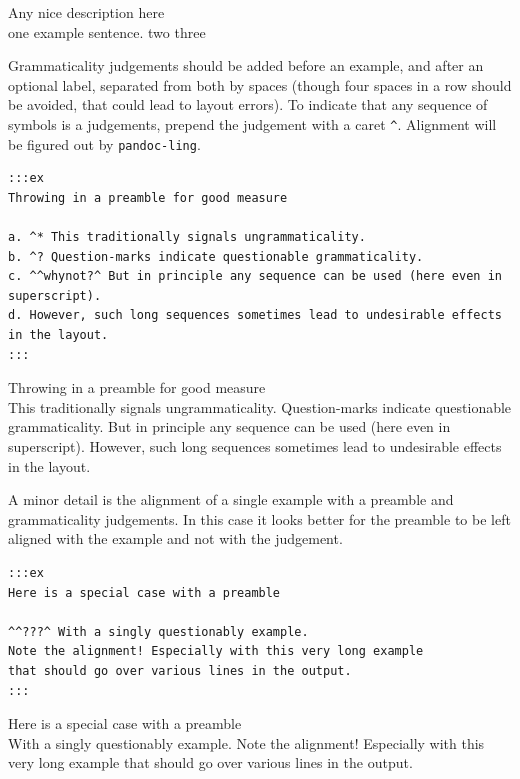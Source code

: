\documentclass[
]{article}
\begin{document}
\begin{samepage}
 Any nice description here\\
  \a one example sentence.
  \a two
  \a three
\xe
\end{samepage}

Grammaticality judgements should be added before an example, and after
an optional label, separated from both by spaces (though four spaces in
a row should be avoided, that could lead to layout errors). To indicate
that any sequence of symbols is a judgements, prepend the judgement with
a caret \texttt{\^{}}. Alignment will be figured out by
\texttt{pandoc-ling}.

\begin{verbatim}
:::ex
Throwing in a preamble for good measure

a. ^* This traditionally signals ungrammaticality.
b. ^? Question-marks indicate questionable grammaticality.
c. ^^whynot?^ But in principle any sequence can be used (here even in superscript).
d. However, such long sequences sometimes lead to undesirable effects in the layout.
:::
\end{verbatim}

\begin{samepage}
 Throwing in a preamble for good measure\\
  \a \ljudge{*}This traditionally signals ungrammaticality.
  \a {}Question-marks indicate questionable grammaticality.
  \a {}But in principle any sequence can
be used (here even in superscript).
  \a However, such long sequences sometimes lead to undesirable effects
in the layout.
\xe
\end{samepage}

A minor detail is the alignment of a single example with a preamble and
grammaticality judgements. In this case it looks better for the preamble
to be left aligned with the example and not with the judgement.

\begin{verbatim}
:::ex
Here is a special case with a preamble

^^???^ With a singly questionably example.
Note the alignment! Especially with this very long example
that should go over various lines in the output.
:::
\end{verbatim}

\begin{samepage}
 Here is a special case with a preamble\\
  
   With a singly questionably example. Note
the alignment! Especially with this very long example that should go
over various lines in the output.
\xe
\end{samepage}
\end{document}
